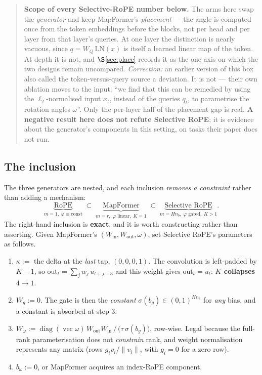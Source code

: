 \documentclass[11pt]{article}
\newcommand{\nb}{n_b}
\begin{document}
\begin{quote}\small
\textbf{Scope of every Selective-RoPE number below.} The arms here swap the
\emph{generator} and keep MapFormer's \emph{placement} --- the angle is computed
once from the token embeddings before the blocks, not per head and per layer from
that layer's queries. At one layer the distinction is nearly vacuous, since
$q = W_Q\,\mathrm{LN}(x)$ is itself a learned linear map of the token. At depth it
is not, and $\S$\ref{sec:place} records it as the one axis on which the two designs
remain uncompared. \emph{Correction:} an earlier version of this box also called the
token-versus-query source a deviation. It is not --- their own ablation moves to the
input: ``we find that this can be remedied by using the $\ell_2$-normalised input
$x_t$, instead of the queries $q_t$, to parametrise the rotation angles $\omega$''.
Only the per-layer half of the placement gap is real.
\textbf{A negative result here does not refute Selective RoPE}; it is
evidence about the generator's components in this setting, on tasks their paper
does not run.
\end{quote}

\subsection{The inclusion}
\label{sec:incl}

The three generators are nested, and each inclusion \emph{removes a constraint}
rather than adding a mechanism:
\[
  \underbrace{\text{RoPE}}_{m=1,\;\varphi\equiv\mathrm{const}}
  \;\subset\;
  \underbrace{\text{MapFormer}}_{m=r,\;\varphi\text{ linear},\;K=1}
  \;\subset\;
  \underbrace{\text{Selective RoPE}}_{m=H\nb,\;\varphi\text{ gated},\;K>1}.
\]
The right-hand inclusion is \textbf{exact}, and it is worth constructing rather
than asserting. Given MapFormer's $(W_{\mathrm{in}}, W_{\mathrm{out}}, \omega)$,
set Selective RoPE's parameters as follows.

\begin{enumerate}\itemsep2pt
\item[\textbf{1}] $\kappa :=$ the delta at the \emph{last} tap, $(0,0,0,1)$. The
  convolution is left-padded by $K-1$, so $\text{out}_t = \sum_j w_j\,u_{t+j-3}$
  and this weight gives $\text{out}_t = u_t$: \textbf{$K$ collapses $4\to1$}.
\item[\textbf{2}] $W_g := 0$. The gate is then the \emph{constant}
  $\sigma(b_g)\in(0,1)^{H\nb}$ for \emph{any} bias, and a constant is absorbed at
  step 3.
\item[\textbf{3}] $W_\omega := \operatorname{diag}(\operatorname{vec}\omega)\,
  W_{\mathrm{out}}W_{\mathrm{in}} \,/\, \big(\tau\,\sigma(b_g)\big)$, row-wise.
  Legal because the full-rank parameterisation does not \emph{constrain} rank, and
  weight normalisation represents any matrix (rows $g_i v_i/\lVert v_i\rVert$,
  with $g_i=0$ for a zero row).
\item[\textbf{4}] $b_\omega := 0$, or MapFormer acquires an index-RoPE component.
\end{enumerate}
\end{document}

